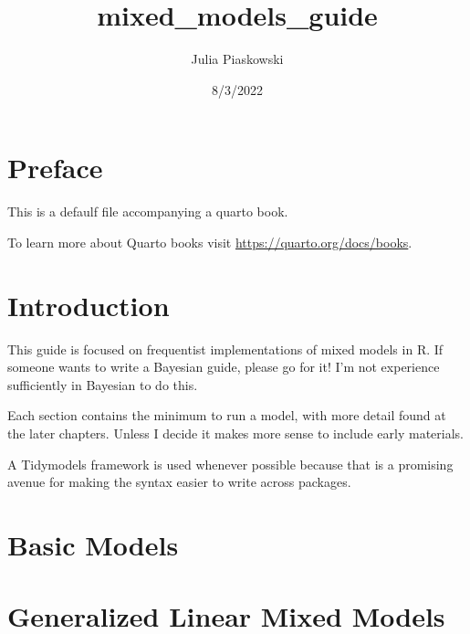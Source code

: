 \documentclass[
  letterpaper,
  DIV=11,
  numbers=noendperiod]{scrreprt}
\title{mixed\_models\_guide}
\author{Julia Piaskowski}
\date{8/3/2022}
\renewcommand*\contentsname{Table of contents}
\newcommand\contentsname{Table of contents}
\begin{document}
\maketitle
\ifdefined\Shaded\renewenvironment{Shaded}{\begin{tcolorbox}[sharp corners, enhanced, borderline west={3pt}{0pt}{shadecolor}, breakable, frame hidden, interior hidden, boxrule=0pt]}{\end{tcolorbox}}\fi

\renewcommand*\contentsname{Table of contents}
{
\hypersetup{linkcolor=}
\setcounter{tocdepth}{2}
\tableofcontents
}

\hypertarget{preface}{%
\chapter*{Preface}\label{preface}}

This is a defaulf file accompanying a quarto book.

To learn more about Quarto books visit
\url{https://quarto.org/docs/books}.


\hypertarget{introduction}{%
\chapter{Introduction}\label{introduction}}

This guide is focused on frequentist implementations of mixed models in
R. If someone wants to write a Bayesian guide, please go for it! I'm not
experience sufficiently in Bayesian to do this.

Each section contains the minimum to run a model, with more detail found
at the later chapters. Unless I decide it makes more sense to include
early materials.

A Tidymodels framework is used whenever possible because that is a
promising avenue for making the syntax easier to write across packages.


\hypertarget{basic-models}{%
\chapter{Basic Models}\label{basic-models}}


\hypertarget{generalized-linear-mixed-models}{%
\chapter{Generalized Linear Mixed
Models}\label{generalized-linear-mixed-models}}
\end{document}
